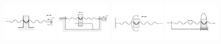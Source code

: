 \documentclass{article}
\begin{document}
\begin{multicols}{3}
\includegraphics[width = 0.2\textwidth]{23_1}
\includegraphics[width = 0.2\textwidth]{23_2}
\includegraphics[width = 0.2\textwidth]{23_3}
\includegraphics[width = 0.2\textwidth]{23_4}


\end{multicols}
\end{document}
